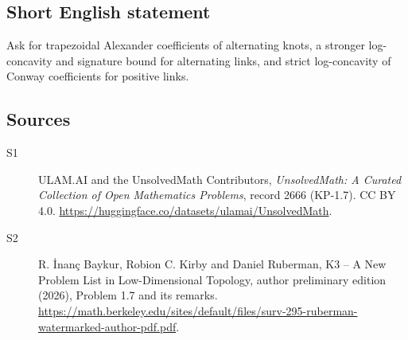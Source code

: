 \documentclass[11pt]{article}
\begin{document}
\subsection{Short English statement}
Ask for trapezoidal Alexander coefficients of alternating knots, a stronger log-concavity and signature bound for alternating links, and strict log-concavity of Conway coefficients for positive links.
\subsection{Sources}
\begin{description}
\item[\hypertarget{source:2666:1}{S1}] ULAM.AI and the UnsolvedMath Contributors, \emph{UnsolvedMath: A Curated Collection of Open Mathematics Problems}, record 2666 (KP-1.7). CC BY 4.0. \url{https://huggingface.co/datasets/ulamai/UnsolvedMath}.
\item[\hypertarget{source:2666:2}{S2}] R. \.{I}nan\c{c} Baykur, Robion C. Kirby and Daniel Ruberman, K3 -- A New Problem List in Low-Dimensional Topology, author preliminary edition (2026), Problem 1.7 and its remarks. \url{https://math.berkeley.edu/sites/default/files/surv-295-ruberman-watermarked-author-pdf.pdf}.
\end{description}
\label{end:2666}
\end{document}
